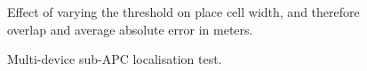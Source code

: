 \begin{figure}[h!]
\centering
\setlength{}
	\setlength{} 
\caption{Effect of varying the threshold on place cell width, and therefore overlap and average absolute error in meters.}
\label{fig:threshEval}
\end{figure}


\begin{figure}
\centering
\setlength{}
	\setlength{}
		
\caption{Multi-device sub-APC localisation test.}
\label{fig:multiDevice}
\end{figure}


%		



%	
%
%		


